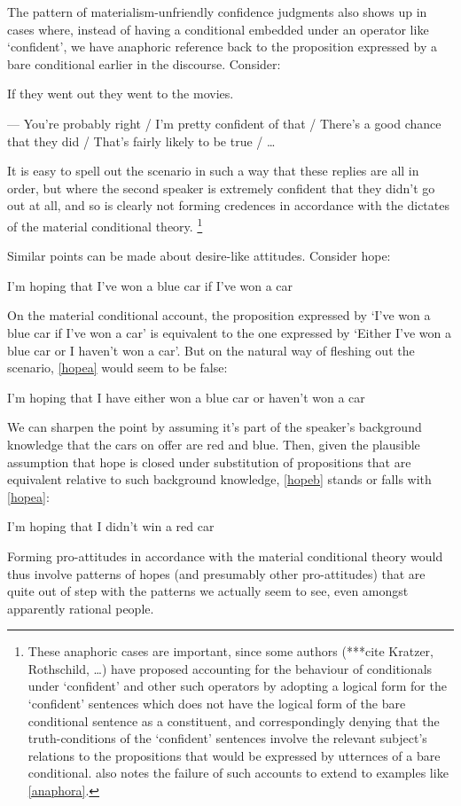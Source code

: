 \documentclass[If.tex]{subfiles}
\begin{document}
The pattern of materialism-unfriendly confidence judgments also shows up in cases where, instead of having a conditional embedded under an operator like ‘confident’, we have anaphoric reference back to the proposition expressed by a bare conditional earlier in the discourse.  Consider:
\begin{prop}
	\nitem \label{anaphora}
	If they went out they went to the movies.  
	
	--- You're probably right / I'm pretty confident of that / There's a good chance that they did / That's fairly likely to be true / … %
\end{prop}
It is easy to spell out the scenario in such a way that these replies are all in order, but where the second speaker is extremely confident that they didn't go out at all, and so is clearly not forming credences in accordance with the dictates of the material conditional theory.%
\footnote{These anaphoric cases are important, since some authors (***cite Kratzer, Rothschild, …) have proposed accounting for the behaviour of conditionals under ‘confident’ and other such operators by adopting a logical form for the ‘confident’ sentences which does not have the logical form of the bare conditional sentence as a constituent, and correspondingly denying that the truth-conditions of the ‘confident’ sentences involve the relevant subject's relations to the propositions that would be expressed by utternces of a bare conditional.  \citet{vonFintelIf, vonFintelConditionals} also notes the failure of such accounts to extend to examples like \ref{anaphora}.}  

Similar points can be made about desire-like attitudes.  Consider hope:
\begin{prop}
	\nitem \label{hopeblue}
	I'm hoping that I've won a blue car if I've won a car
\end{prop}
On the material conditional account, the proposition expressed by ‘I've won a blue car if I've won a car’ is equivalent to the one expressed by ‘Either I've won a blue car or I haven't won a car’.  But on the natural way of fleshing out the scenario, \ref{hopea} would seem to be false:
\begin{prop}
	\nitem \label{hopea}
	I'm hoping that I have either won a blue car or haven't won a car	
\end{prop}
We can sharpen the point by assuming it's part of the speaker's background knowledge that the cars on offer are red and blue.  Then, given the plausible assumption that hope is closed under substitution of propositions that are equivalent relative to such background knowledge, \ref{hopeb} stands or falls with \ref{hopea}:
\begin{prop}
	\nitem \label{hopeb}
	I'm hoping that I didn't win a red car
\end{prop}
Forming pro-attitudes in accordance with the material conditional theory would thus involve patterns of hopes (and presumably other pro-attitudes) that are quite out of step with the patterns we actually seem to see, even amongst apparently rational people.  
\end{document}
